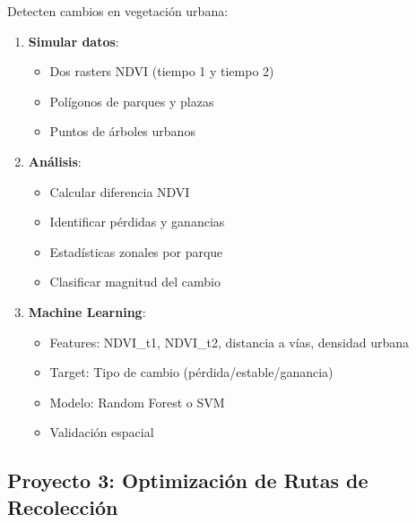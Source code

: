 \documentclass[11pt,a4paper]{article}
\newcommand{\ejercicio}[1]{\begin{tcolorbox}[colback=red!5,colframe=red,title={Ejercicio}]#1\end{tcolorbox}}
\begin{document}
\ejercicio{
Detecten cambios en vegetación urbana:

\begin{enumerate}
    \item \textbf{Simular datos}:
    \begin{itemize}
        \item Dos rasters NDVI (tiempo 1 y tiempo 2)
        \item Polígonos de parques y plazas
        \item Puntos de árboles urbanos
    \end{itemize}
    
    \item \textbf{Análisis}:
    \begin{itemize}
        \item Calcular diferencia NDVI
        \item Identificar pérdidas y ganancias
        \item Estadísticas zonales por parque
        \item Clasificar magnitud del cambio
    \end{itemize}
    
    \item \textbf{Machine Learning}:
    \begin{itemize}
        \item Features: NDVI\_t1, NDVI\_t2, distancia a vías, densidad urbana
        \item Target: Tipo de cambio (pérdida/estable/ganancia)
        \item Modelo: Random Forest o SVM
        \item Validación espacial
    \end{itemize}
\end{enumerate}
}

\subsection{Proyecto 3: Optimización de Rutas de Recolección}
\end{document}
